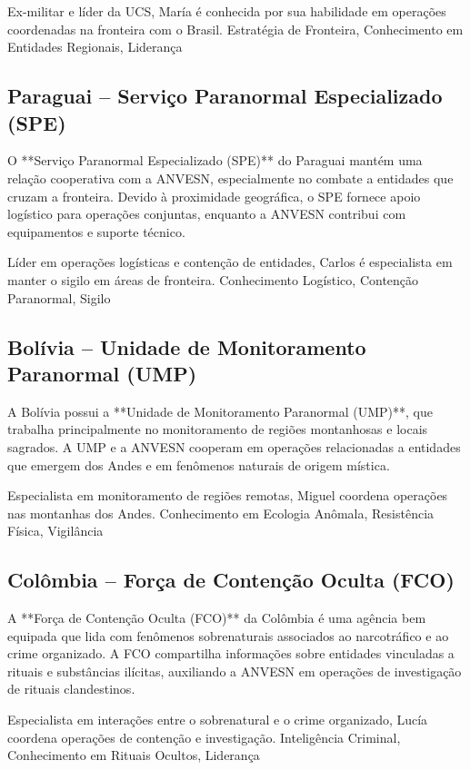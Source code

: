 {Ex-militar e líder da UCS, María é conhecida por sua habilidade em operações coordenadas na fronteira com o Brasil.}
{Estratégia de Fronteira, Conhecimento em Entidades Regionais, Liderança}

\subsection{Paraguai – Serviço Paranormal Especializado (SPE)}
O **Serviço Paranormal Especializado (SPE)** do Paraguai mantém uma relação cooperativa com a ANVESN, especialmente no combate a entidades que cruzam a fronteira. Devido à proximidade geográfica, o SPE fornece apoio logístico para operações conjuntas, enquanto a ANVESN contribui com equipamentos e suporte técnico.

{Líder em operações logísticas e contenção de entidades, Carlos é especialista em manter o sigilo em áreas de fronteira.}
{Conhecimento Logístico, Contenção Paranormal, Sigilo}

\subsection{Bolívia – Unidade de Monitoramento Paranormal (UMP)}
A Bolívia possui a **Unidade de Monitoramento Paranormal (UMP)**, que trabalha principalmente no monitoramento de regiões montanhosas e locais sagrados. A UMP e a ANVESN cooperam em operações relacionadas a entidades que emergem dos Andes e em fenômenos naturais de origem mística.

{Especialista em monitoramento de regiões remotas, Miguel coordena operações nas montanhas dos Andes.}
{Conhecimento em Ecologia Anômala, Resistência Física, Vigilância}

\subsection{Colômbia – Força de Contenção Oculta (FCO)}
A **Força de Contenção Oculta (FCO)** da Colômbia é uma agência bem equipada que lida com fenômenos sobrenaturais associados ao narcotráfico e ao crime organizado. A FCO compartilha informações sobre entidades vinculadas a rituais e substâncias ilícitas, auxiliando a ANVESN em operações de investigação de rituais clandestinos.

{Especialista em interações entre o sobrenatural e o crime organizado, Lucía coordena operações de contenção e investigação.}
{Inteligência Criminal, Conhecimento em Rituais Ocultos, Liderança}

